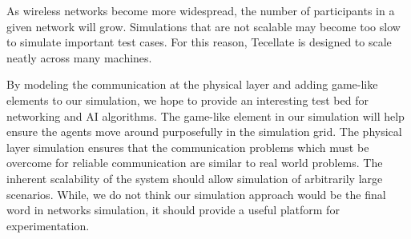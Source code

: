 \documentclass[12pt]{article}
\begin{document}
As wireless networks become more widespread, the number of participants in a given network will
grow. Simulations that are not scalable may become too slow to simulate important test cases. For
this reason, Tecellate is designed to scale neatly across many machines.

By modeling the communication at the physical layer and adding game-like elements to our simulation,
we hope to provide an interesting test bed for networking and AI algorithms. The game-like element
in our simulation will help ensure the agents move around purposefully in the simulation grid. The
physical layer simulation ensures that the communication problems which must be overcome for
reliable communication are similar to real world problems. The inherent scalability of the system
should allow simulation of arbitrarily large scenarios. While, we do not think our simulation
approach would be the final word in networks simulation, it should provide a useful platform for
experimentation.











\nocite{*}


\end{document}
